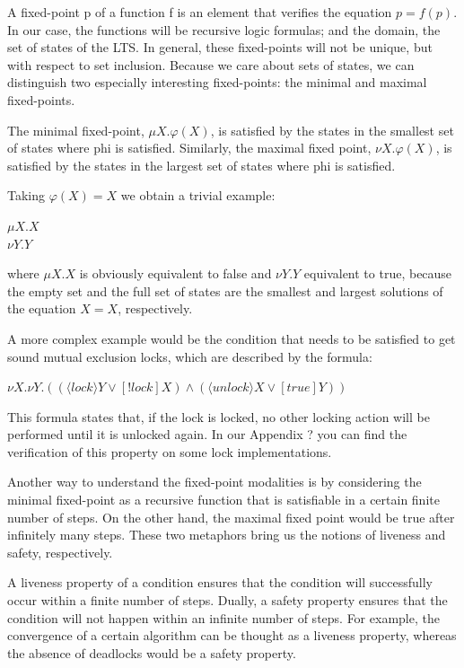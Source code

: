 \documentclass[11pt]{article}
\theoremstyle{definition}
\theoremstyle{plain}
\theoremstyle{definition}
\let\temp\phi
\let\phi\varphi
\let\varphi\temp
\begin{document}
A fixed-point p of a function f is an element that verifies the equation $ p = f(p) $. In our case, the functions will be recursive logic formulas; and the domain, the set of states of the LTS. In general, these fixed-points will not be unique, but with respect to set inclusion. Because we care about sets of states, we can distinguish two especially interesting fixed-points: the minimal and maximal fixed-points.

The minimal fixed-point, $ \mu X.\phi(X) $, is satisfied by the states in the smallest set of states where phi is satisfied. Similarly, the maximal fixed point, $ \nu X.\phi(X) $, is satisfied by the states in the largest set of states where phi is satisfied.

Taking $ \phi(X)=X $ we obtain a trivial example:
\begin{center}
	$ \mu X. X $ \\
	$ \nu Y. Y $
\end{center}

where $ \mu X. X $ is obviously equivalent to false and $ \nu Y. Y $ equivalent to true, because the empty set and the full set of states are the smallest and largest solutions of the equation $ X = X $, respectively.

A more complex example would be the condition that needs to be satisfied to get sound mutual exclusion locks, which are described by the formula:

\begin{center}
	$ \nu X. \nu Y. ((\langle lock\rangle Y \vee [!lock]X) \wedge (\langle unlock\rangle X \vee [true] Y)) $
\end{center}

This formula states that, if the lock is locked, no other locking action will be performed until it is unlocked again. In our Appendix ? you can find the verification of this property on some lock implementations.


Another way to understand the fixed-point modalities is by considering the minimal fixed-point as a recursive function that is satisfiable in a certain finite number of steps. On the other hand, the maximal fixed point would be true after infinitely many steps. These two metaphors bring us the notions of liveness and safety, respectively.

A liveness property of a condition ensures that the condition will successfully occur within a finite number of steps. Dually, a safety property ensures that the condition will not happen within an infinite number of steps. For example, the convergence of a certain algorithm can be thought as a liveness property, whereas the absence of deadlocks would be a safety property.
\end{document}
